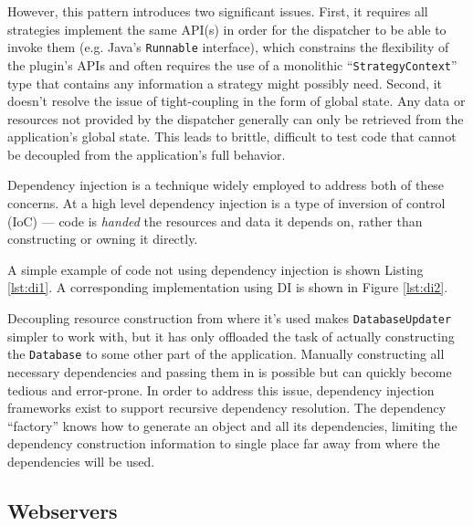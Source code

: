 \documentclass[sigconf]{acmart}
\def\code#1{\lstinline{#1}}
\begin{document}
However, this pattern introduces two significant issues. First, it requires all strategies implement the same API(s) in order for the dispatcher to be able to invoke them (e.g. Java's \code{Runnable} interface), which constrains the flexibility of the plugin's APIs and often requires the use of a monolithic ``\code{StrategyContext}'' type that contains any information a strategy might possibly need. Second, it doesn't resolve the issue of tight-coupling in the form of global state. Any data or resources not provided by the dispatcher generally can only be retrieved from the application's global state. This leads to brittle, difficult to test code that cannot be decoupled from the application's full behavior.

Dependency injection is a technique widely employed to address both of these concerns. At a high level dependency injection is a type of inversion of control (IoC) --- code is \textit{handed} the resources and data it depends on, rather than constructing or owning it directly.

A simple example of code not using dependency injection is shown Listing \ref{lst:di1}. A corresponding implementation using DI is shown in Figure \ref{lst:di2}.

\begin{minipage}{\linewidth}

\end{minipage}

\begin{minipage}{\linewidth}

\end{minipage}

Decoupling resource construction from where it's used makes \code{DatabaseUpdater} simpler to work with, but it has only offloaded the task of actually constructing the \code{Database} to some other part of the application. Manually constructing all necessary dependencies and passing them in is possible but can quickly become tedious and error-prone. In order to address this issue, dependency injection frameworks exist to support recursive dependency resolution. The dependency ``factory'' knows how to generate an object and all its dependencies, limiting the dependency construction information to single place far away from where the dependencies will be used. 

\subsection{Webservers}
\end{document}
